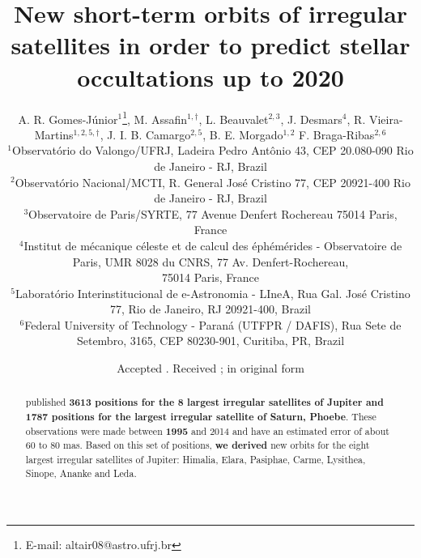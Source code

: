 \documentclass[useAMS,usenatbib]{mn2e}
\title[Orbits and predictions for occultations up to 2020]{New short-term orbits of irregular satellites in order to predict stellar occultations up to 2020}
\author[A. R. Gomes-J\'unior, M. Assafin, L. Beauvalet et al.]{A. R. Gomes-J\'unior$^{1}$\thanks{E-mail: altair08@astro.ufrj.br},
M. Assafin$^{1,\dag}$,
L. Beauvalet$^{2,3}$,
J. Desmars$^{4}$,\newauthor
R. Vieira-Martins$^{1,2,5,\dag}$,
J. I. B. Camargo$^{2,5}$,
B. E. Morgado$^{1,2}$
F. Braga-Ribas$^{2,6}$
\\
$^{1}$Observat\'orio do Valongo/UFRJ, Ladeira Pedro Ant\^onio 43,
CEP 20.080-090 Rio de Janeiro - RJ, Brazil\\
$^{2}$Observat\'orio Nacional/MCTI, R. General Jos\'e Cristino 77, CEP 20921-400 Rio de Janeiro - RJ, Brazil\\
$^{3}$Observatoire de Paris/SYRTE, 77 Avenue Denfert Rochereau 75014 Paris, France\\
$^{4}$Institut de m\'ecanique c\'eleste et de calcul des \'eph\'em\'erides - Observatoire de Paris, UMR 8028 du CNRS, 77 Av. Denfert-Rochereau,\\ 75014 Paris, France\\
$^{5}$Laborat\'orio Interinstitucional de e-Astronomia - LIneA, Rua Gal. Jos\'e Cristino 77, Rio de Janeiro, RJ 20921-400, Brazil\\
$^{6}$Federal University of Technology - Paran\'a (UTFPR / DAFIS), Rua Sete de Setembro, 3165, CEP 80230-901, Curitiba, PR, Brazil
}
\begin{document}
\newcommand{\noccs}{5442 } %

\date{Accepted . Received ; in original form }

\pagerange{\pageref{firstpage}--\pageref{lastpage}} 

\maketitle

\label{firstpage}

\begin{abstract}
\cite{GomesJunior2015} published \textbf{3613 positions for the 8 largest irregular satellites of Jupiter and 1787 positions for the largest irregular satellite of Saturn, Phoebe}.  These observations were made between \textbf{1995} and 2014 and have an estimated error of about 60 to 80 mas. Based on this set of positions, \textbf{we derived} new orbits for the eight largest irregular satellites of Jupiter: Himalia, Elara, Pasiphae, Carme, Lysithea, Sinope, Ananke and Leda. %

\end{abstract}
\end{document}
